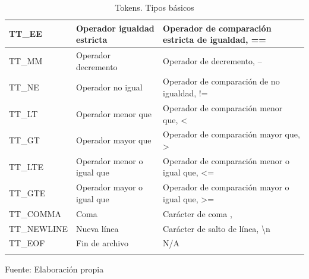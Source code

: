 \begin{center}
\begin{longtable}{|l|m{10em}|m{14em}|}
    \hline
    TT\_EE & Operador igualdad estricta & Operador de comparación estricta de igualdad, == \\
    \hline
    TT\_MM & Operador decremento & Operador de decremento, -- \\
    \hline
    TT\_NE &Operador no igual &Operador de comparación de no igualdad, != \\
    \hline
    TT\_LT & Operador menor que & Operador de comparación menor que, < \\
    \hline
    TT\_GT & Operador mayor que & Operador de comparación mayor que, > \\
    \hline
    TT\_LTE & Operador menor o igual que & Operador de comparación menor o igual que, <= \\
    \hline
    TT\_GTE & Operador mayor o igual que & Operador de comparación mayor o igual que, >= \\
    \hline
    TT\_COMMA & Coma & Carácter de coma , \\
    \hline
    TT\_NEWLINE & Nueva línea & Carácter de salto de línea, \textbackslash n \\
    \hline
    TT\_EOF & Fin de archivo & N/A \\
    \hline
    \caption{Tokens. Tipos básicos}
  \end{longtable}
  \vspace*{-4.5em}
  \centering Fuente: Elaboración propia
\end{center}

